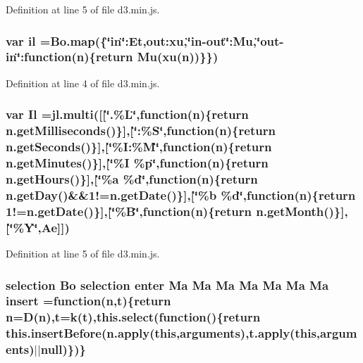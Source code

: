 Definition at line 5 of file d3.\+min.\+js.

\subsubsection[{il}]{\setlength{\rightskip}{0pt plus 5cm}var il ={\bf Bo.\+map}(\{\char`\"{}in\char`\"{}\+:Et,out\+:xu,\char`\"{}in-\/out\char`\"{}\+:Mu,\char`\"{}out-\/in\char`\"{}\+:function({\bf n})\{{\bf return} {\bf Mu}({\bf xu}({\bf n}))\}\})}\label{d3_8min_8js_a3301c613bd6e2f9283c2d49f8df0258f}


Definition at line 4 of file d3.\+min.\+js.

\subsubsection[{Il}]{\setlength{\rightskip}{0pt plus 5cm}var Il =jl.\+multi([[\char`\"{}.\%L\char`\"{},function({\bf n})\{{\bf return} n.\+get\+Milliseconds()\}],[\char`\"{}\+:\%S\char`\"{},function({\bf n})\{{\bf return} n.\+get\+Seconds()\}],[\char`\"{}\%I\+:\%M\char`\"{},function({\bf n})\{{\bf return} n.\+get\+Minutes()\}],[\char`\"{}\%I \%p\char`\"{},function({\bf n})\{{\bf return} n.\+get\+Hours()\}],[\char`\"{}\%a \%{\bf d}\char`\"{},function({\bf n})\{{\bf return} n.\+get\+Day()\&\&1!=n.\+get\+Date()\}],[\char`\"{}\%b \%{\bf d}\char`\"{},function({\bf n})\{{\bf return} 1!=n.\+get\+Date()\}],[\char`\"{}\%B\char`\"{},function({\bf n})\{{\bf return} n.\+get\+Month()\}],[\char`\"{}\%Y\char`\"{},Ae]])}\label{d3_8min_8js_ab4732db05547c105be3ed576bfc8cc3e}


Definition at line 5 of file d3.\+min.\+js.

\subsubsection[{insert}]{ {\bf selection} {\bf Bo} {\bf selection} {\bf enter} {\bf Ma} {\bf Ma} {\bf Ma} {\bf Ma} {\bf Ma} {\bf Ma} {\bf Ma} insert =function({\bf n},t)\{{\bf return} {\bf n}=D({\bf n}),t=k(t),{\bf this.\+select}(function()\{{\bf return} this.\+insert\+Before(n.\+apply({\bf this},arguments),t.\+apply({\bf this},arguments)$\vert$$\vert$null)\})\}}\label{d3_8min_8js_a5e9f031d8b98816f31ce7beb7743f807}


